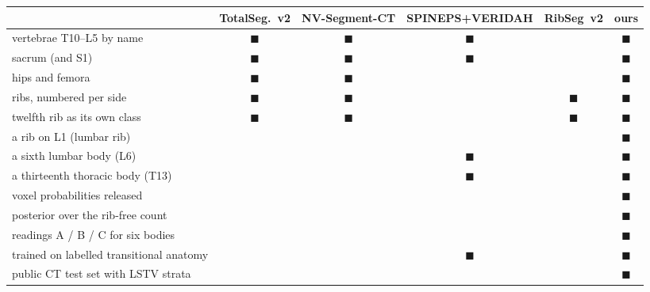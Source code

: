 \begin{tabular}{lccccc}
\toprule
 & TotalSeg.~v2 & NV-Segment-CT & SPINEPS+VERIDAH & RibSeg~v2 & \textbf{ours} \\
\midrule
vertebrae T10--L5 by name & $\blacksquare$ & $\blacksquare$ & $\blacksquare$ &  & $\blacksquare$ \\
sacrum (and S1) & $\blacksquare$ & $\blacksquare$ & $\blacksquare$ &  & $\blacksquare$ \\
hips and femora & $\blacksquare$ & $\blacksquare$ &  &  & $\blacksquare$ \\
ribs, numbered per side & $\blacksquare$ & $\blacksquare$ &  & $\blacksquare$ & $\blacksquare$ \\
twelfth rib as its own class & $\blacksquare$ & $\blacksquare$ &  & $\blacksquare$ & $\blacksquare$ \\
a rib on L1 (lumbar rib) &  &  &  &  & $\blacksquare$ \\
a sixth lumbar body (L6) &  &  & $\blacksquare$ &  & $\blacksquare$ \\
a thirteenth thoracic body (T13) &  &  & $\blacksquare$ &  & $\blacksquare$ \\
voxel probabilities released &  &  &  &  & $\blacksquare$ \\
posterior over the rib-free count &  &  &  &  & $\blacksquare$ \\
readings A / B / C for six bodies &  &  &  &  & $\blacksquare$ \\
trained on labelled transitional anatomy &  &  & $\blacksquare$ &  & $\blacksquare$ \\
public CT test set with LSTV strata &  &  &  &  & $\blacksquare$ \\
\bottomrule
\end{tabular}
